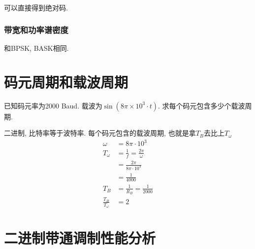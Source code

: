 \documentclass[a4paper]{report}
\begin{document}
可以直接得到绝对码. 
\subsubsection{带宽和功率谱密度}
和BPSK, BASK相同. 
\section{码元周期和载波周期}
已知码元率为2000 Baud. 载波为$\sin(8\pi\times 10^3\cdot t)$. 求每个码元包含多少个载波周期. 

二进制, 比特率等于波特率. 每个码元包含的载波周期, 也就是拿$T_B$去比上$T_\omega$
\begin{align*}
  \omega&=8\pi\cdot 10^3\\
  T_\omega&=\frac{1}{f}=\frac{2\pi}{\omega}
  \\ &=\frac{2\pi}{8\pi\cdot 10^3}
  \\ &=\frac{1}{4000}
  \\ T_B&=\frac{1}{R_B}=\frac{1}{2000}
  \\ \frac{T_B}{T_\omega}&=2
\end{align*}
\section{二进制带通调制性能分析}
\end{document}
